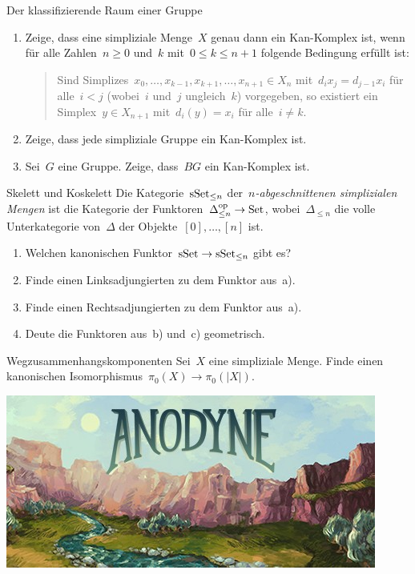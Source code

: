 \documentclass{uebblatt}
\begin{document}

\begin{aufgabe}{Der klassifizierende Raum einer Gruppe}
\begin{enumerate}
\item Zeige, dass eine simpliziale Menge~$X$ genau dann ein Kan-Komplex ist,
wenn für alle Zahlen~$n \geq 0$ und~$k$ mit~$0 \leq k \leq n + 1$ folgende Bedingung erfüllt ist:
\begin{quote}Sind Simplizes~$x_0,\ldots,x_{k-1},x_{k+1},\ldots,x_{n+1} \in X_n$
mit~$d_i x_j = d_{j-1} x_i$ für alle~$i < j$ (wobei~$i$ und~$j$ ungleich~$k$)
vorgegeben, so existiert ein Simplex~$y \in X_{n+1}$ mit~$d_i(y) = x_i$ für
alle~$i \neq k$.\end{quote}
\item Zeige, dass jede simpliziale Gruppe ein Kan-Komplex ist.
\item Sei~$G$ eine Gruppe. Zeige, dass~$BG$ ein Kan-Komplex ist.
\end{enumerate}
\end{aufgabe}

\begin{aufgabe}{Skelett und Koskelett}
Die Kategorie~$\mathrm{sSet}_{\leq n}$ der~\emph{$n$-abgeschnittenen simplizialen Mengen}
ist die Kategorie der Funktoren~$\Delta_{\leq n}^{\mathrm{op}} \to \mathrm{Set}$,
wobei~$\Delta_{\leq n}$ die volle Unterkategorie von~$\Delta$ der
Objekte~$[0],\ldots,[n]$ ist.
\begin{enumerate}
\item Welchen kanonischen Funktor~$\mathrm{sSet} \to \mathrm{sSet}_{\leq n}$ gibt es?
\item Finde einen Linksadjungierten zu dem Funktor aus~a).
\item Finde einen Rechtsadjungierten zu dem Funktor aus~a).
\item Deute die Funktoren aus~b) und~c) geometrisch.
\end{enumerate}
\end{aufgabe}

\begin{aufgabe}{Wegzusammenhangskomponenten}
Sei~$X$ eine simpliziale Menge. Finde einen kanonischen Isomorphismus~$\pi_0(X)
\to \pi_0(|X|)$.
\end{aufgabe}

\vfill
\centering
\href{http://www.anodynegame.com/}{\includegraphics[scale=0.85]{images/anodyne}}
\par
\end{document}
